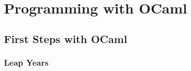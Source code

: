 \documentclass[]{book}
\begin{document}
\tableofcontents

\pagebreak
\part{Programming with OCaml}
\chapter{First Steps with OCaml}\label{chap:debuter}
\section{Leap Years}

\label{lastpage}
\cleardoublepage
{}\label{index}
\small\printindex
\end{document}
